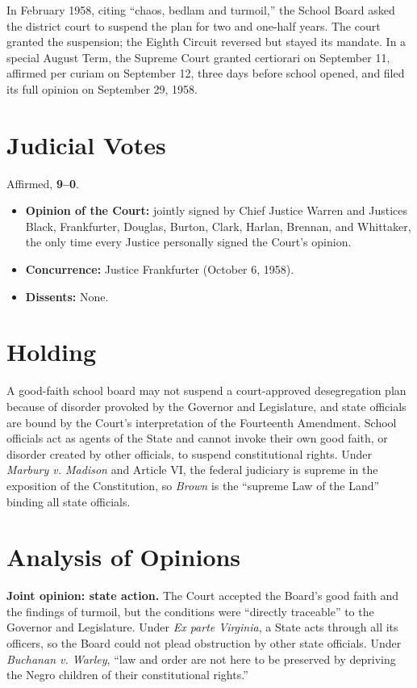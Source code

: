 \documentclass[12pt]{article}
\begin{document}
In February 1958, citing ``chaos, bedlam and turmoil,'' the School Board asked the district court to suspend the plan for two and one-half years. The court granted the suspension; the Eighth Circuit reversed but stayed its mandate. In a special August Term, the Supreme Court granted certiorari on September 11, affirmed per curiam on September 12, three days before school opened, and filed its full opinion on September 29, 1958.

\section{Judicial Votes}

Affirmed, \textbf{9--0}.
\begin{itemize}
\item \textbf{Opinion of the Court:} jointly signed by Chief Justice Warren and Justices Black, Frankfurter, Douglas, Burton, Clark, Harlan, Brennan, and Whittaker, the only time every Justice personally signed the Court's opinion.
\item \textbf{Concurrence:} Justice Frankfurter (October 6, 1958).
\item \textbf{Dissents:} None.
\end{itemize}

\section{Holding}

A good-faith school board may not suspend a court-approved desegregation plan because of disorder provoked by the Governor and Legislature, and state officials are bound by the Court's interpretation of the Fourteenth Amendment. School officials act as agents of the State and cannot invoke their own good faith, or disorder created by other officials, to suspend constitutional rights. Under \textit{Marbury v. Madison} and Article VI, the federal judiciary is supreme in the exposition of the Constitution, so \textit{Brown} is the ``supreme Law of the Land'' binding all state officials.

\section{Analysis of Opinions}

\textbf{Joint opinion: state action.} The Court accepted the Board's good faith and the findings of turmoil, but the conditions were ``directly traceable'' to the Governor and Legislature. Under \textit{Ex parte Virginia}, a State acts through all its officers, so the Board could not plead obstruction by other state officials. Under \textit{Buchanan v. Warley}, ``law and order are not here to be preserved by depriving the Negro children of their constitutional rights.''
\end{document}
